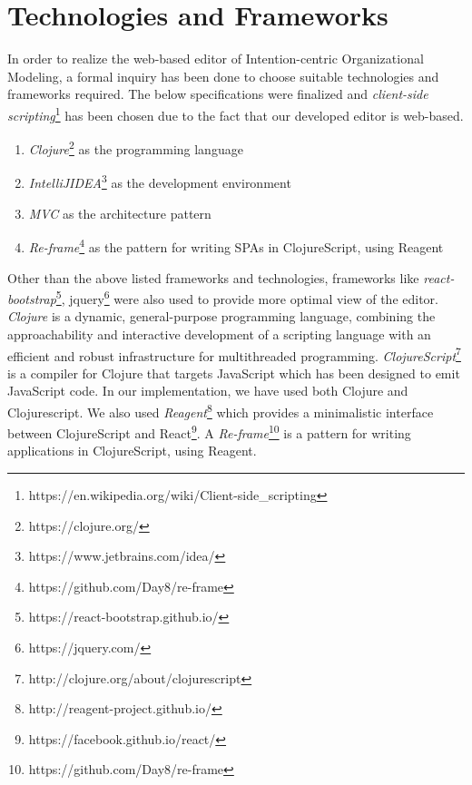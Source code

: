 \section{Technologies and Frameworks}
\label{subsec:specifications}
In order to realize the web-based editor of Intention-centric Organizational Modeling, a formal inquiry has been done to choose suitable technologies and frameworks required. The below specifications were finalized and \textit{client-side scripting}\footnote{https://en.wikipedia.org/wiki/Client-side\_scripting} has been chosen due to the fact that our developed editor is web-based. 

\begin{enumerate}   
	\item \textit{Clojure}\footnote{https://clojure.org/} as the programming language
	\item \textit{IntelliJIDEA}\footnote{https://www.jetbrains.com/idea/} as the development environment
	\item \textit{MVC}  as the architecture pattern
	\item \textit{Re-frame}\footnote{https://github.com/Day8/re-frame} as the pattern for writing SPAs in ClojureScript, using Reagent	
\end{enumerate}

Other than the above listed frameworks and technologies, frameworks like \textit{react-bootstrap}\footnote{https://react-bootstrap.github.io/}, jquery\footnote{https://jquery.com/} were also used to provide more optimal view of the editor. \textit{Clojure} is a dynamic, general-purpose programming language, combining the approachability and interactive development of a scripting language with an efficient and robust infrastructure for multithreaded programming. \textit{ClojureScript}\footnote{http://clojure.org/about/clojurescript} is a compiler for Clojure that targets JavaScript which has been designed to emit JavaScript code. In our implementation, we have used both Clojure and Clojurescript. We also used \textit{Reagent}\footnote{http://reagent-project.github.io/} which provides a minimalistic interface between ClojureScript and React\footnote{https://facebook.github.io/react/}. A \textit{Re-frame}\footnote{https://github.com/Day8/re-frame} is a pattern for writing applications in ClojureScript, using Reagent.

